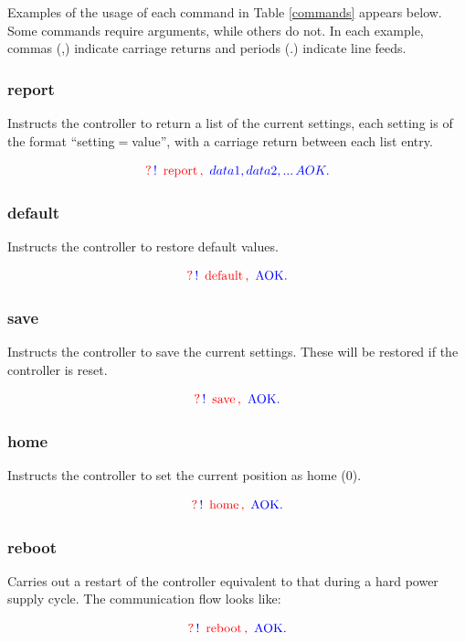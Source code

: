 \documentclass[10pt]{article}
\newcommand{\exchange}[2]{
\begin{equation}
 \nonumber \textcolor{red}{?} \, \textcolor{blue}{!} \, \textcolor{red}{\text { #1}} \,\textcolor{red}{\text{#2, }} \, \textcolor{blue}{\text{AOK.}}
 \end{equation}
}
\newcommand{\exchangeWithData}[2]{
\begin{equation}
 \nonumber \textcolor{red}{?} \, \textcolor{blue}{!} \, \textcolor{red}{\text { #1}} \,\textcolor{red}{\text{#2, }} \, \textcolor{blue}{data1,data2,...} \, \textcolor{blue}{AOK.}
 \end{equation}
}
\begin{document}
Examples of the usage of each command in Table \ref{commands} appears below.  Some commands require arguments, while others do not.
In each example, commas (,) indicate carriage returns and periods (.) indicate line feeds.  

\subsubsection{report}
\label{report}
Instructs the controller to return a list of the current settings, each setting is of the format ``setting$=$value'', with a carriage return between each list entry. 

\exchangeWithData{report}{} 

\subsubsection{default}
\label{default}
Instructs the controller to restore default values. 

\exchange{default}{}

\subsubsection{save}
\label{save}
Instructs the controller to save the current settings.  These will be restored if the controller is reset.

\exchange{save}{}

\subsubsection{home}
\label{home} 
Instructs the controller to set the current position as home (0).

\exchange{home}{}
    
\subsubsection{reboot}
\label{reboot}
Carries out a restart of the controller equivalent to that during a hard power supply cycle.  The communication flow looks like:    

\exchange{reboot}{}

\end{document}
